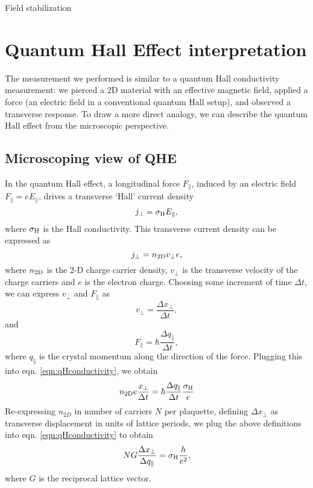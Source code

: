 	Field stabilization

\section{Quantum Hall Effect interpretation}

The measurement we performed is similar to a quantum Hall conductivity measurement: we pierced a 2D material with an effective magnetic field, applied a force (an electric field in a conventional quantum Hall setup), and observed a transverse response. To draw a more direct analogy, we can describe the quantum Hall effect from the microscopic perspective. 

\subsection{Microscoping view of QHE}
In the quantum Hall effect, a longitudinal force $F_{\parallel}$, induced by an electric field $F_{\parallel}=e E_{\parallel}$, drives a transverse `Hall' current density 
\begin{equation}
j_{\perp} = \sigma_{\rm{H}} E_{\parallel},
\label{eqn:qHconductivity}
\end{equation}
where $\sigma_{\rm{H}}$ is the Hall conductivity.  This transverse current density can be expressed as 
\begin{equation}
j_{\perp}=n_{2\rm{D}}v_{\perp}e,
\end{equation}
where $n_{2\rm{D}}$ is the 2-D charge carrier density, $v_{\perp}$ is the transverse velocity of the charge carriers and $e$ is the electron charge. Choosing some increment of time $\Delta t$, we can express $v_{\perp}$ and $F_{\parallel}$ as 
\begin{equation}
v_{\perp}=\frac{\Delta x_{\perp}}{\Delta t},
\end{equation}
and 
\begin{equation}
F_{\parallel} = \hbar \frac{\Delta q_{\parallel}}{\Delta t},
\end{equation}
where $q_{\parallel}$ is the crystal momentum along the direction of the force. Plugging this into eqn. \ref{eqn:qHconductivity}, we obtain
\begin{equation}
n_{2{\rm D}} e  \frac{x_{\perp}}{\Delta t} = \hbar \frac{\Delta q_{\parallel}}{\Delta t} \frac{\sigma_{\rm H}}{e}
\end{equation}
 Re-expressing $n_{2D}$ in number of carriers $N$ per plaquette, defining $\Delta x_{\perp}$ as transverse displacement in units of lattice periods, we plug the above definitions into eqn. \ref{eqn:qHconductivity} to obtain
\begin{equation}
N G\frac{\Delta x_{\perp}}{\Delta q_{\parallel}}=\sigma_{\rm{H}} \frac{h}{e^2},
\label{eqn:qHconductivityMicro}
\end{equation}
where $G$ is the reciprocal lattice vector. 

